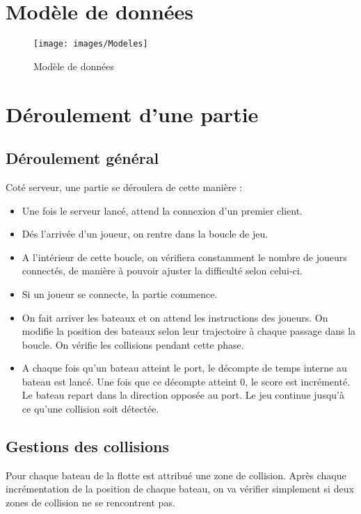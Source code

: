 
\section{Modèle de données}

\begin{figure}[htbp]
  \centering
  \texttt{[image: images/Modeles]}
  \caption{Modèle de données}
  \label{fig:modele}
\end{figure}



\section{Déroulement d'une partie}

\subsection{Déroulement général}

Coté serveur, une partie se déroulera de cette manière :
\begin{itemize}
\item Une fois le serveur lancé, attend la connexion d'un premier client.
\item Dés l'arrivée d'un joueur, on rentre dans la boucle de jeu.
\item A l'intérieur de cette boucle, on vérifiera constamment le nombre de joueurs connectés, de manière à pouvoir ajuster la difficulté selon celui-ci.
\item Si un joueur se connecte, la partie commence.
\item On fait arriver les bateaux et on attend les instructions des joueurs. On modifie la position des bateaux selon leur trajectoire à chaque passage dans la boucle. On vérifie les collisions pendant cette phase.
\item A chaque fois qu'un bateau atteint le port, le décompte de temps interne au bateau est lancé. Une fois que ce décompte atteint 0, le score est incrémenté. Le bateau repart dans la direction opposée au port. Le jeu continue jusqu'à ce qu'une collision soit détectée. 
\end{itemize}

\subsection{Gestions des collisions}

Pour chaque bateau de la flotte est attribué une zone de collision. Après chaque incrémentation de la position de chaque bateau, on va vérifier simplement si deux zones de collision ne se rencontrent pas.


